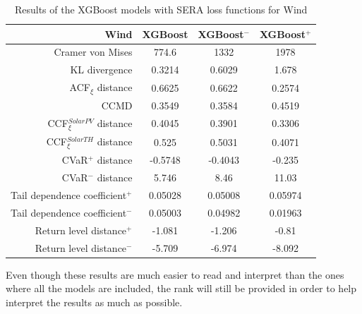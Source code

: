 \begin{table}[ht]
    \centering
    \footnotesize
    \begin{tabular}[r]{r|c|cc}
        \toprule
        \textbf{Wind}&XGBoost&XGBoost$^-$&XGBoost$^+$ \\
        \midrule            
        Cramer von Mises&774.6&1332&1978 \\
        KL divergence&0.3214&0.6029&1.678 \\
        ACF$_\xi$ distance&0.6625&0.6622&0.2574 \\
        \midrule
        CCMD&0.3549&0.3584&0.4519 \\
        CCF$_\xi^{Solar PV}$ distance&0.4045&0.3901&0.3306 \\
        CCF$_\xi^{Solar TH}$ distance&0.525&0.5031&0.4071 \\
        \midrule
        CVaR$^+$ distance&-0.5748&-0.4043&-0.235 \\
        CVaR$^-$ distance&5.746&8.46&11.03 \\
        Tail dependence coefficient$^+$&0.05028&0.05008&0.05974 \\
        Tail dependence coefficient$^-$&0.05003&0.04982&0.01963 \\
        Return level distance$^+$&-1.081&-1.206&-0.81 \\
        Return level distance$^-$&-5.709&-6.974&-8.092 \\
        \bottomrule
    \end{tabular}
    \caption{Results of the XGBoost models with SERA loss functions for Wind\label{long}}
    \label{table:results-custom-loss}
\end{table}

Even though these results are much easier to read and interpret than the ones where all the models are included, the rank will still be provided in order to help interpret the results as much as possible. 


